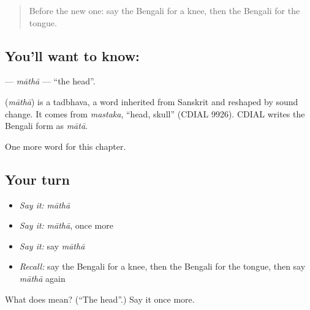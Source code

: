 \begin{quote}
Before the new one: say the Bengali for a knee, then the Bengali for the tongue.
\end{quote}

\subsection*{You'll want to know: }
\textbf{} — \emph{māthā} — \textquotedblleft{}the head\textquotedblright{}.

\begin{cousinweb}
\textbf{} (\emph{māthā}) is a tadbhava, a word inherited from Sanskrit and reshaped by sound change. It comes from \emph{mastaka}, \textquotedblleft{}head, skull\textquotedblright{} (CDIAL 9926). CDIAL writes the Bengali form as \emph{mātā}.
\end{cousinweb}

\begin{grammarlens}[title={What you've built}]
One more word for this chapter.
\end{grammarlens}

\subsection*{Your turn}
\begin{itemize}
\raggedright
  \item \emph{Say it:} \emph{māthā}
  \item \emph{Say it:} \emph{māthā}, once more
  \item \emph{Say it:} say \emph{māthā}
  \item \emph{Recall:} say the Bengali for a knee, then the Bengali for the tongue, then say \emph{māthā} again
\end{itemize}

\begin{tcolorbox}[breakable,colback=teal!4,colframe=teal!35!black,title={Before you move on}]
What does  mean? (\textquotedblleft{}The head\textquotedblright{}.) Say it once more.
\end{tcolorbox}
